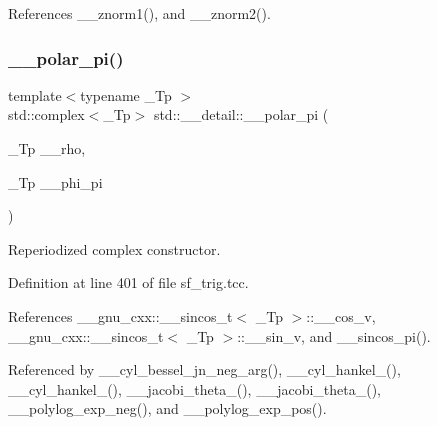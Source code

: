 References \+\_\+\+\_\+znorm1(), and \+\_\+\+\_\+znorm2().

\mbox{\label{namespacestd_1_1____detail_ac69e259ad511fcc7a54c6ec315adcfa4}} 
\subsubsection{\texorpdfstring{\+\_\+\+\_\+polar\+\_\+pi()}{\_\_polar\_pi()}\hspace{0.1cm}{\footnotesize\ttfamily [1/2]}}
{\footnotesize\ttfamily template$<$typename \+\_\+\+Tp $>$ \\
std\+::complex$<$\+\_\+\+Tp$>$ std\+::\+\_\+\+\_\+detail\+::\+\_\+\+\_\+polar\+\_\+pi (\begin{DoxyParamCaption}\item[{\+\_\+\+Tp}]{\+\_\+\+\_\+rho,  }\item[{\+\_\+\+Tp}]{\+\_\+\+\_\+phi\+\_\+pi }\end{DoxyParamCaption})\hspace{0.3cm}{\ttfamily [inline]}}

Reperiodized complex constructor. 

Definition at line 401 of file sf\+\_\+trig.\+tcc.



References \+\_\+\+\_\+gnu\+\_\+cxx\+::\+\_\+\+\_\+sincos\+\_\+t$<$ \+\_\+\+Tp $>$\+::\+\_\+\+\_\+cos\+\_\+v, \+\_\+\+\_\+gnu\+\_\+cxx\+::\+\_\+\+\_\+sincos\+\_\+t$<$ \+\_\+\+Tp $>$\+::\+\_\+\+\_\+sin\+\_\+v, and \+\_\+\+\_\+sincos\+\_\+pi().



Referenced by \+\_\+\+\_\+cyl\+\_\+bessel\+\_\+jn\+\_\+neg\+\_\+arg(), \+\_\+\+\_\+cyl\+\_\+hankel\+\_(), \+\_\+\+\_\+cyl\+\_\+hankel\+\_(), \+\_\+\+\_\+jacobi\+\_\+theta\+\_(), \+\_\+\+\_\+jacobi\+\_\+theta\+\_(), \+\_\+\+\_\+polylog\+\_\+exp\+\_\+neg(), and \+\_\+\+\_\+polylog\+\_\+exp\+\_\+pos().

\mbox{\label{namespacestd_1_1____detail_a627c0e19f6b3e90af25735f351662d53}} 
